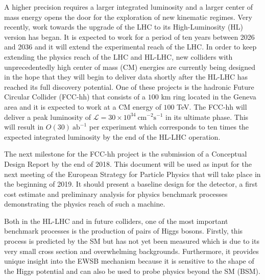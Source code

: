A higher precision requires a larger integrated luminosity and a larger center of mass energy opens the door for the exploration of new kinematic regimes. Very recently, work towards the upgrade of the LHC to its High-Luminosity (HL) version has began. It is expected to work for a period of ten years between 2026 and 2036 and it will extend the experimental reach of the LHC. In order to keep extending the physics reach of the LHC and HL-LHC, new colliders with unprecedentedly high center of mass (CM) energies are currently being designed in the hope that they will begin to deliver data shortly after the HL-LHC has reached its full discovery potential. One of these projects is the hadronic Future Circular Collider (FCC-hh) that consists of a $100$ km ring located in the Geneva area and it is expected to work at a CM energy of $100$ TeV. The FCC-hh will deliver a peak luminosity of $\mathcal{L}=30\times 10^{34}~\text{cm}^{-2}\text{s}^{-1}$ in its ultimate phase. This will result in $O(30)~\text{ab}^{-1}$ per experiment which corresponds to ten times the expected integrated luminosity by the end of the HL-LHC operation. 

The next milestone for the FCC-hh project is the submission of a Conceptual Design Report by the end of 2018. This document will be used as input for the next meeting of the European Strategy for Particle Physics that will take place in the beginning of 2019. It should present a baseline design for the detector, a first cost estimate and preliminary analysis for physics benchmark processes demonstrating the physics reach of such a machine.

Both in the HL-LHC and in future colliders, one of the most important benchmark processes is the production of pairs of Higgs bosons. Firstly, this process is predicted by the SM but has not yet been measured which is due to its very small cross section and overwhelming backgrounds. Furthermore, it provides unique insight into the EWSB mechanism because it is sensitive to the shape of the Higgs potential and can also be used to probe physics beyond the SM (BSM).

